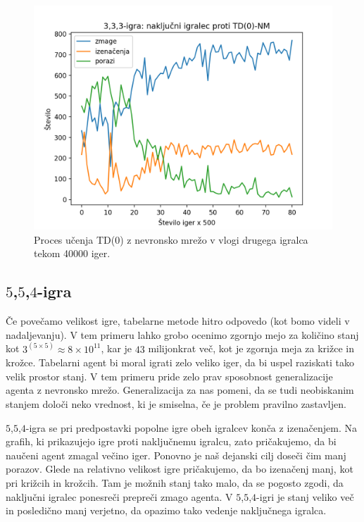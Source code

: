 \documentclass[12pt,a4paper]{amsart}
\theoremstyle{definition} %
\theoremstyle{plain} %
\begin{document}
\begin{figure}[H]
    \includegraphics[scale=0.715]{../rezultati/tdnn-333-40000-2.png}
    \caption{Proces učenja TD($0$) z nevronsko mrežo v vlogi drugega igralca tekom 40000 iger.}
\end{figure}

\subsection{$5$,$5$,$4$-igra}
Če povečamo velikost igre, tabelarne metode hitro odpovedo (kot bomo videli v nadaljevanju). V tem 
primeru lahko grobo ocenimo zgornjo mejo za količino stanj kot $3 ^ {(5 \times 5)} \approx 8 \times 
10^{11}$, kar je $43$ milijonkrat več, kot je zgornja meja za križce in krožce. Tabelarni agent bi 
moral igrati zelo veliko iger, da bi uspel raziskati tako velik prostor stanj. V tem primeru pride zelo 
prav sposobnost generalizacije agenta z nevronsko mrežo. Generalizacija za nas pomeni, da se tudi 
neobiskanim stanjem določi neko vrednost, ki je smiselna, če je problem pravilno zastavljen.

$5$,$5$,$4$-igra se pri predpostavki popolne igre obeh igralcev konča z izenačenjem. Na grafih, ki 
prikazujejo igre proti naključnemu igralcu, zato pričakujemo, da bi naučeni agent zmagal večino iger. 
Ponovno je naš dejanski cilj doseči čim manj porazov. Glede na relativno velikost igre pričakujemo, 
da bo izenačenj manj, kot pri križcih in krožcih. Tam je možnih stanj tako malo, da se pogosto zgodi, 
da naključni igralec ponesreči prepreči zmago agenta. V $5$,$5$,$4$-igri je stanj veliko več in 
posledično manj verjetno, da opazimo tako vedenje naključnega igralca.
\end{document}
